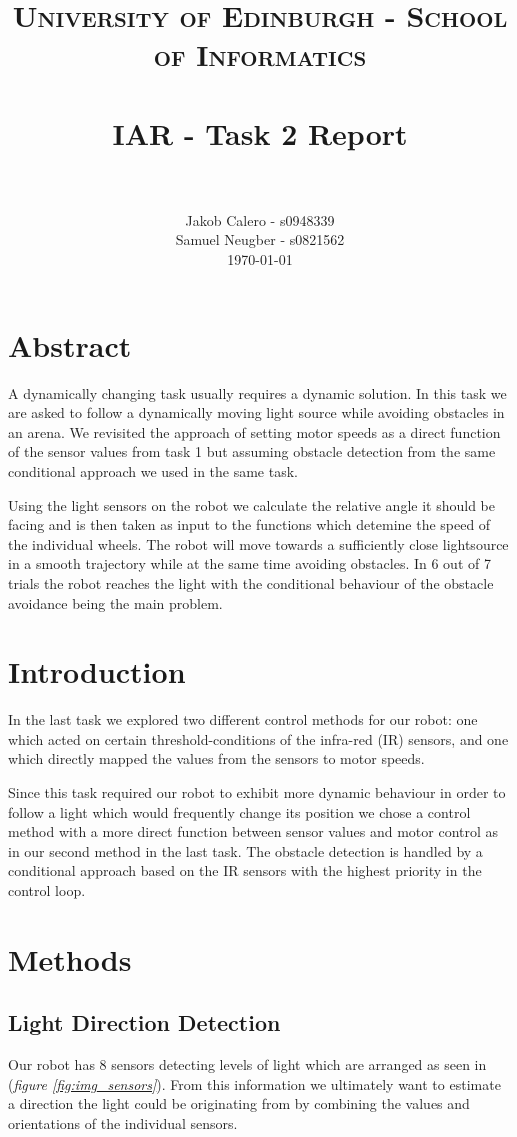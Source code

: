 \documentclass[paper=a4, fontsize=12pt]{scrartcl}	%
\title{
\vspace{-1in} 	
\usefont{OT1}{bch}{b}{n}
\normalfont \normalsize \textsc{University of Edinburgh - School of Informatics}
\\ [25pt]
\horrule{0.5pt} \\[0.4cm]
\large IAR - Task 2 Report \\
\horrule{1pt} \\[0.5cm]
}
\author{
  \normalfont \normalsize
  Jakob Calero - s0948339\\[-3pt]\normalsize
  Samuel Neugber - s0821562\\[-3pt]\normalsize
  \today
}
\date{}
\numberwithin{equation}{section}		%
\numberwithin{figure}{section}			%
\numberwithin{table}{section}				%
\begin{document}
\maketitle					%
\section{Abstract}
A dynamically changing task usually requires a dynamic solution. In this task we are asked to follow a dynamically moving light source while avoiding obstacles in an arena. We revisited the approach of setting motor speeds as a direct function of the sensor values from task 1 but assuming obstacle detection from the same conditional approach we used in the same task.

Using the light sensors on the robot we calculate the relative angle it should be facing and is then taken as input to the functions which detemine the speed of the individual wheels. The robot will move towards a sufficiently close lightsource in a smooth trajectory while at the same time avoiding obstacles. In 6 out of 7 trials the robot reaches the light with the conditional behaviour of the obstacle avoidance being the main problem.

\section{Introduction}
In the last task we explored two different control methods for our robot: one which acted on certain threshold-conditions of the infra-red (IR) sensors, and one which directly mapped the values from the sensors to motor speeds.

Since this task required our robot to exhibit more dynamic behaviour in order to follow a light which would frequently change its position we chose a control method with a more direct function between sensor values and motor control as in our second method in the last task. The obstacle detection is handled by a conditional approach based on the IR sensors with the highest priority in the control loop.

\section{Methods} 
\subsection{Light Direction Detection}
\label{LDD}
Our robot has 8 sensors detecting levels of light which are arranged as seen in (\emph{figure \ref{fig:img_sensors}}). From this information we ultimately want to estimate a direction the light could be originating from by combining the values and orientations of the individual sensors.
\end{document}
